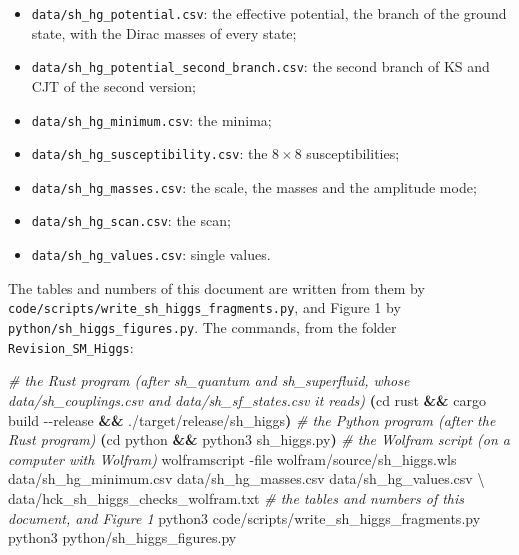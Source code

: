 \documentclass[
  10pt,
]{article}
\newenvironment{Shaded}{}{}
\newcommand{\AttributeTok}[1]{\textcolor[rgb]{0.49,0.56,0.16}{#1}}
\newcommand{\BuiltInTok}[1]{\textcolor[rgb]{0.00,0.50,0.00}{#1}}
\newcommand{\CommentTok}[1]{\textcolor[rgb]{0.38,0.63,0.69}{\textit{#1}}}
\newcommand{\DataTypeTok}[1]{\textcolor[rgb]{0.56,0.13,0.00}{#1}}
\newcommand{\ExtensionTok}[1]{#1}
\newcommand{\KeywordTok}[1]{\textcolor[rgb]{0.00,0.44,0.13}{\textbf{#1}}}
\newcommand{\NormalTok}[1]{#1}
\providecommand{\tightlist}{%
  \setlength{\itemsep}{0pt}\setlength{\parskip}{0pt}}
\begin{document}
\begin{itemize}
\tightlist
\item
  \texttt{data/sh\_hg\_potential.csv}: the effective potential, the
  branch of the ground state, with the Dirac masses of every state;
\item
  \texttt{data/sh\_hg\_potential\_second\_branch.csv}: the second branch
  of KS and CJT of the second version;
\item
  \texttt{data/sh\_hg\_minimum.csv}: the minima;
\item
  \texttt{data/sh\_hg\_susceptibility.csv}: the \(8\times8\)
  susceptibilities;
\item
  \texttt{data/sh\_hg\_masses.csv}: the scale, the masses and the
  amplitude mode;
\item
  \texttt{data/sh\_hg\_scan.csv}: the scan;
\item
  \texttt{data/sh\_hg\_values.csv}: single values.
\end{itemize}

The tables and numbers of this document are written from them by
\texttt{code/scripts/write\_sh\_higgs\_fragments.py}, and Figure 1 by
\texttt{python/sh\_higgs\_figures.py}. The commands, from the folder
\texttt{Revision\_SM\_Higgs}:

\begin{Shaded}
\begin{Highlighting}[]
\CommentTok{\# the Rust program (after sh\_quantum and sh\_superfluid, whose data/sh\_couplings.csv and data/sh\_sf\_states.csv it reads)}
\KeywordTok{(}\BuiltInTok{cd}\NormalTok{ rust }\KeywordTok{\&\&} \ExtensionTok{cargo}\NormalTok{ build }\AttributeTok{{-}{-}release} \KeywordTok{\&\&} \ExtensionTok{./target/release/sh\_higgs}\KeywordTok{)}
\CommentTok{\# the Python program (after the Rust program)}
\KeywordTok{(}\BuiltInTok{cd}\NormalTok{ python }\KeywordTok{\&\&} \ExtensionTok{python3}\NormalTok{ sh\_higgs.py}\KeywordTok{)}
\CommentTok{\# the Wolfram script (on a computer with Wolfram)}
\ExtensionTok{wolframscript} \AttributeTok{{-}file}\NormalTok{ wolfram/source/sh\_higgs.wls data/sh\_hg\_minimum.csv data/sh\_hg\_masses.csv data/sh\_hg\_values.csv }\DataTypeTok{\textbackslash{}}
\NormalTok{    data/hck\_sh\_higgs\_checks\_wolfram.txt}
\CommentTok{\# the tables and numbers of this document, and Figure 1}
\ExtensionTok{python3}\NormalTok{ code/scripts/write\_sh\_higgs\_fragments.py}
\ExtensionTok{python3}\NormalTok{ python/sh\_higgs\_figures.py}
\end{Highlighting}
\end{Shaded}
\end{document}

